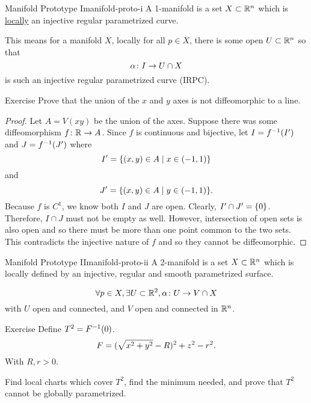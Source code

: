 \documentclass{article}
\begin{document}
\begin{definition}{Manifold Prototype I}{manifold-proto-i}
  A 1-manifold is a set $X \subset \RR[n]$ which is \underline{locally}
  an injective regular parametrized curve.
\end{definition}

This means for a manifold $X$, locally for all $p \in X$,
there is some open $U \subset \RR[n]$ so that
\[ \alpha \from I \to U \cap X \]
is such an injective regular parametrized curve (IRPC).


\begin{example}{Exercise}{}
  Prove that the union of the $x$ and $y$ axes is not diffeomorphic to a line.
\end{example}
\begin{proof}
  Let $A = V(xy)$ be the union of the axes.
  Suppose there was some diffeomorphism $f \from \RR \to A$.
  Since $f$ is continuous and bijective, let $I = f\inv(I')$ and $J = f\inv(J')$ where
  \[ I' = \set{ (x, y) \in A \mid x \in (-1, 1) } \]
  and
  \[ J' = \set{ (x, y) \in A \mid y \in (-1, 1) }. \]
  Because $f$ is $C^{1}$, we know both $I$ and $J$ are open.
  Clearly, $I' \cap J' = \set{0}$. Therefore, $I \cap J$ must not be empty as well.
  However, intersection of open sets is also open and so there must be more than one
  point common to the two sets.
  This contradicts the injective nature of $f$ and so they cannot be diffeomorphic.
\end{proof}


\begin{definition}{Manifold Prototype II}{manifold-proto-ii}
  A 2-manifold is a set $X \subset \RR[n]$ which is locally defined by
  an injective, regular and smooth parametrized surface.

  \[ \forall p \in X, \exists U \subset \RR[2], \alpha \from U \to V \cap X \]
  with $U$ open and connected, and $V$ open and connected in $\RR[n]$.
\end{definition}

\begin{example}{Exercise}{}
  Define  $T^{2} = F\inv(0)$.
  \[ F = \pars{\sqrt{x^{2} + y^{2}} - R}^{2} + z^{2} - r^{2}. \]
  With $R, r > 0$.

  Find local charts which cover $T^{2}$, find the minimum needed,
  and prove that $T^{2}$ cannot be globally parametrized.
\end{example}
\end{document}

